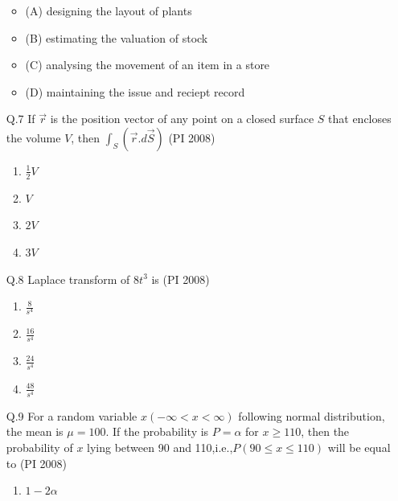 \documentclass[journal,12pt,onecolumn]{IEEEtran}
\theoremstyle{remark}
\begin{document}
\begin{enumerate}
\begin{itemize}[label={}]
        \item (A) designing the layout of plants
        \item (B) estimating the valuation of stock
        \item (C) analysing the movement of an item in a store
        \item (D) maintaining the issue and reciept record
    \end{itemize}
    \vspace{1cm}
    \item[\textnormal{Q.7}]  If $\Vec{r}$ is the position vector of any point on a closed surface $S$ that encloses the volume $V$, then    
    $\int_{S}\left(\vec{r}.d\vec{S}\right)$ 
    \hfill{(PI 2008)}
    \begin{multicols}{4}
    \begin{enumerate}[label=(\Alph*)]
        \item $\frac{1}{2}V$
        \item $V$
        \item $2V$
        \item $3V$
    \end{enumerate}
\end{multicols}
\vspace{1cm}
\item[\textnormal{Q.8}]  Laplace transform of $8t^3$ is     \hfill{(PI 2008)}
    \begin{multicols}{4}
    \begin{enumerate}[label=(\Alph*)]
        \item $\frac{8}{s^4}$
        \item $\frac{16}{s^4}$
        \item $\frac{24}{s^4}$
        \item $\frac{48}{s^4}$
    \end{enumerate}
\end{multicols}
\vspace{1cm}
\item[\textnormal{Q.9}]  For a random variable $x (-\infty<x<\infty)$ following normal distribution, the mean is $\mu=100$. If the probability is $P=\alpha$ for $x\geq110$, then the probability of $x$ lying between 90 and 110,i.e.,$P(90\leq x \leq 110 )$ will be equal to
    \hfill{(PI 2008)}
    \begin{multicols}{4}
    \begin{enumerate}[label=(\Alph*)]
        \item $1-2\alpha$

\end{enumerate}
\end{multicols}
\end{enumerate}
\end{document}
